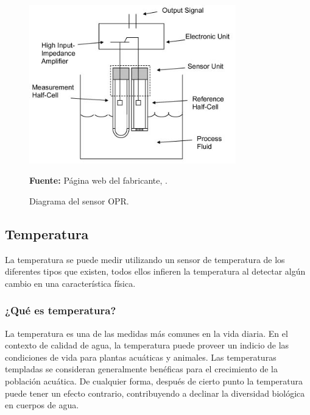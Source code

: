 \begin{figure}[ht]
    \centering
    \includegraphics[width=0.8\textwidth]{Imagenes/cap2/ORP_Sensor_Image.jpg}
    \caption {Diagrama del sensor OPR. }
    \textbf{Fuente:} Página web del fabricante,
    \cite{orp_sensor_measure_nodate}.
    \label{fig:opr}
\end{figure}

\subsection{Temperatura}
La temperatura se puede medir utilizando un sensor de temperatura de los diferentes tipos que existen, todos ellos infieren la temperatura al detectar alg\'un cambio en una caracter\'istica f\'isica. 

\subsubsection{¿Qué es temperatura?}
La temperatura es una de las medidas más comunes en la vida diaria. 
En el contexto de calidad de agua, la temperatura puede proveer un indicio de las condiciones de vida para plantas acu\'aticas y animales.  
Las temperaturas templadas se consideran generalmente ben\'eficas para el crecimiento de la poblaci\'on acu\'atica. 
De cualquier forma, despu\'es de cierto punto la temperatura puede tener un efecto contrario, contribuyendo a declinar la diversidad biol\'ogica en cuerpos de agua.

